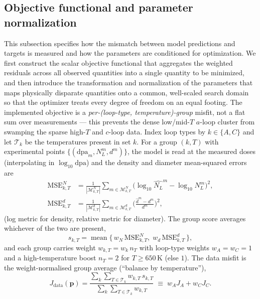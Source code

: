 \documentclass{article}
\newcommand{\param}{\bm{p}}
\newcommand{\dpa}{\mathrm{dpa}}
\newcommand{\NL}{N_{L}}
\begin{document}
\subsection{Objective functional and parameter normalization}\label{sec:objective}
This subsection specifies how the mismatch between model predictions and targets is measured and how the parameters are conditioned for optimization. We first construct the scalar objective functional that aggregates the weighted residuals across all observed quantities into a single quantity to be minimized, and then introduce the transformation and normalization of the parameters that maps physically disparate quantities onto a common, well-scaled search domain so that the optimizer treats every degree of freedom on an equal footing.
The implemented objective is a \emph{per-(loop-type, temperature)-group} misfit,
not a flat sum over measurements --- this prevents the dense low/mid-$T$
$a$-loop cluster from swamping the sparse high-$T$ and $c$-loop data. Index loop
types by $k\in\{A,C\}$ and let $\mathcal{T}_k$ be the temperatures present in set
$k$. For a group $(k,T)$ with experimental points $\{(\dpa_m,\NL^m,d^m)\}$, the
model is read at the measured doses (interpolating in $\log_{10}\dpa$) and the
density and diameter mean-squared errors are
\begin{align}
  \mathrm{MSE}^{N}_{k,T} &= \frac{1}{|\mathcal{M}^N_{k,T}|}\!\!
     \sum_{m\in\mathcal{M}^N_{k,T}}\!\!\big(\log_{10}\widehat{\NL}^m-\log_{10}\NL^m\big)^2,\\
  \mathrm{MSE}^{d}_{k,T} &= \frac{1}{|\mathcal{M}^d_{k,T}|}\!\!
     \sum_{m\in\mathcal{M}^d_{k,T}}\!\!\Big(\frac{\widehat{d}^m-d^m}{d^m}\Big)^2,
\end{align}
(log metric for density, relative metric for diameter). The group score averages
whichever of the two are present,
\begin{equation}
  s_{k,T}=\operatorname{mean}\big\{\,w_{N}\,\mathrm{MSE}^{N}_{k,T},\;
                                    w_{d}\,\mathrm{MSE}^{d}_{k,T}\,\big\},
\end{equation}
and each group carries weight $w_{k,T}=w_k\,n_T$ with loop-type weights
$w_A=w_C=1$ and a high-temperature boost $n_T=2$ for $T\ge 650\,$K (else $1$).
The data misfit is the weight-normalised group average (``balance by
temperature''),
\begin{equation}
  J_{\mathrm{data}}(\param)=
  \frac{\sum_{k}\sum_{T\in\mathcal{T}_k} w_{k,T}\,s_{k,T}}
       {\sum_{k}\sum_{T\in\mathcal{T}_k} w_{k,T}}
  \;\equiv\; w_A J_A + w_C J_C .
\end{equation}
\end{document}
